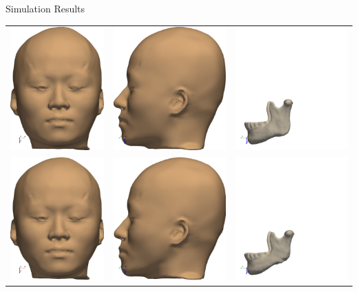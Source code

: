 \documentclass{beamer}
\begin{document}
\begin{frame}{Simulation Results}
  \begin{table}
    \centering
    \begin{tabular}{ccc}
      \includegraphics[height = 0.30 \linewidth]{fig/pre-face-front.pdf}  & \includegraphics[height = 0.30 \linewidth]{fig/pre-face-side.pdf}  & \includegraphics[height = 0.30 \linewidth]{fig/pre-skull-side.pdf}  \\
      \includegraphics[height = 0.30 \linewidth]{fig/post-face-front.pdf} & \includegraphics[height = 0.30 \linewidth]{fig/post-face-side.pdf} & \includegraphics[height = 0.30 \linewidth]{fig/post-skull-side.pdf}

\end{tabular}
\end{table}
\end{frame}
\end{document}
